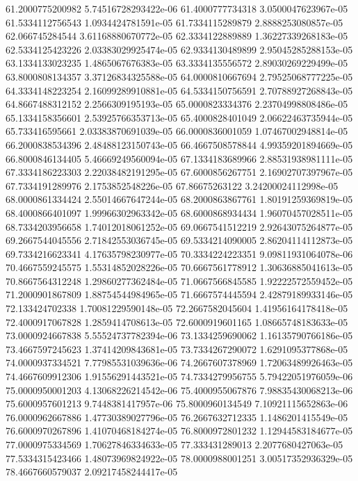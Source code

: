 {61.2000775200982 5.74516728293422e-06
61.4000777734318 3.0500047623967e-05
61.5334112756543 1.0934424781591e-05
61.7334115289879 2.8888253080857e-05
62.066745284544 3.61168880670772e-05
62.3334122889889 1.36227339268183e-05
62.5334125423226 2.03383029925474e-05
62.9334130489899 2.95045285288153e-05
63.1334133023235 1.4865067676383e-05
63.3334135556572 2.89030269229499e-05
63.8000808134357 3.37126834325588e-05
64.0000810667694 2.79525068777225e-05
64.3334148223254 2.16099289910881e-05
64.5334150756591 2.70788927268843e-05
64.8667488312152 2.2566309195193e-05
65.0000823334376 2.23704998808486e-05
65.1334158356601 2.53925766353713e-05
65.4000828401049 2.06622463735944e-05
65.733416595661 2.03383870691039e-05
66.0000836001059 1.07467002948814e-05
66.2000838534396 2.48488123150743e-05
66.4667508578844 4.99359201894669e-05
66.8000846134405 5.46669249560094e-05
67.1334183689966 2.88531938981111e-05
67.3334186223303 2.22038482191295e-05
67.6000856267751 2.16902707397967e-05
67.7334191289976 2.1753852548226e-05
67.86675263122 3.24200024112998e-05
68.0000861334424 2.55014667647244e-05
68.2000863867761 1.80191259369819e-05
68.4000866401097 1.99966302963342e-05
68.6000868934434 1.96070457028511e-05
68.7334203956658 1.74012018061252e-05
69.0667541512219 2.92643075264877e-05
69.2667544045556 2.71842553036745e-05
69.5334214090005 2.86204114112873e-05
69.7334216623341 4.17635798230977e-05
70.3334224223351 9.09811931064078e-06
70.4667559245575 1.55314852028226e-05
70.6667561778912 1.30636885041613e-05
70.8667564312248 1.29860277362484e-05
71.0667566845585 1.92222572559452e-05
71.2000901867809 1.88754544984965e-05
71.6667574445594 2.42879189933146e-05
72.133424702338 1.70081229590148e-05
72.2667582045604 1.41956164178418e-05
72.4000917067828 1.2859414708613e-05
72.6000919601165 1.08665748183633e-05
73.0000924667838 5.55524737782394e-06
73.1334259690062 1.16135790766186e-05
73.4667597245623 1.37414209843681e-05
73.7334267290072 1.6291095377868e-05
74.0000937334521 7.77985531039636e-06
74.2667607378969 1.72063489926463e-05
74.4667609912306 1.91556291443521e-05
74.7334279956755 5.79422051976059e-06
75.0000950001203 4.13068226214542e-06
75.4000955067876 7.98835430068213e-06
75.6000957601213 9.7448381417957e-06
75.8000960134549 7.10921115652863e-06
76.0000962667886 1.47730389027796e-05
76.2667632712335 1.1486201415549e-05
76.6000970267896 1.41070468184274e-05
76.8000972801232 1.12944583184677e-05
77.0000975334569 1.70627846334633e-05
77.333431289013 2.2077680427063e-05
77.5334315423466 1.48073969824922e-05
78.0000988001251 3.00517352936329e-05
78.4667660579037 2.09217458244417e-05
}
